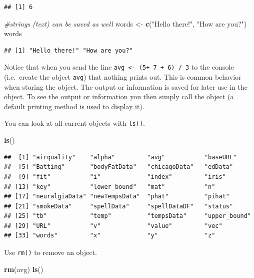 \documentclass[
]{book}
\newenvironment{Shaded}{\begin{snugshade}}{\end{snugshade}}
\newcommand{\CommentTok}[1]{\textcolor[rgb]{0.56,0.35,0.01}{\textit{#1}}}
\newcommand{\KeywordTok}[1]{\textcolor[rgb]{0.13,0.29,0.53}{\textbf{#1}}}
\newcommand{\NormalTok}[1]{#1}
\newcommand{\StringTok}[1]{\textcolor[rgb]{0.31,0.60,0.02}{#1}}
\theoremstyle{definition}
\theoremstyle{definition}
\theoremstyle{definition}
\theoremstyle{remark}
\begin{document}
\begin{verbatim}
## [1] 6
\end{verbatim}

\begin{Shaded}
\begin{Highlighting}[]
\CommentTok{#strings (text) can be saved as well}
\NormalTok{words <-}\StringTok{ }\KeywordTok{c}\NormalTok{(}\StringTok{"Hello there!"}\NormalTok{, }\StringTok{"How are you?"}\NormalTok{)}
\NormalTok{words}
\end{Highlighting}
\end{Shaded}

\begin{verbatim}
## [1] "Hello there!" "How are you?"
\end{verbatim}

Notice that when you send the line \texttt{avg\ \textless{}-\ (5+\ 7\ +\ 6)\ /\ 3} to the console (i.e.~create the object \texttt{avg}) that nothing prints out. This is common behavior when storing the object. The output or information is saved for later use in the object. To see the output or information you then simply call the object (a default printing method is used to display it).

You can look at all current objects with \texttt{ls()}.

\begin{Shaded}
\begin{Highlighting}[]
\KeywordTok{ls}\NormalTok{()}
\end{Highlighting}
\end{Shaded}

\begin{verbatim}
##  [1] "airquality"    "alpha"         "avg"           "baseURL"      
##  [5] "Batting"       "bodyFatData"   "chicagoData"   "edData"       
##  [9] "fit"           "i"             "index"         "iris"         
## [13] "key"           "lower_bound"   "mat"           "n"            
## [17] "neuralgiaData" "newTempsData"  "phat"          "pihat"        
## [21] "smokeData"     "spellData"     "spellDataDF"   "status"       
## [25] "tb"            "temp"          "tempsData"     "upper_bound"  
## [29] "URL"           "v"             "value"         "vec"          
## [33] "words"         "x"             "y"             "z"
\end{verbatim}

Use \texttt{rm()} to remove an object.

\begin{Shaded}
\begin{Highlighting}[]
\KeywordTok{rm}\NormalTok{(avg)}
\KeywordTok{ls}\NormalTok{()}
\end{Highlighting}
\end{Shaded}
\end{document}
